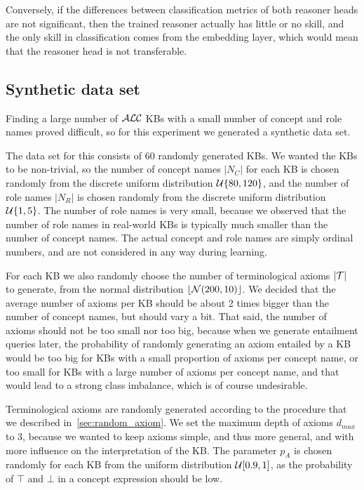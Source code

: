 Conversely, if the differences between classification metrics of both reasoner heads are not significant, then the trained reasoner actually has little or no skill, and the only skill in classification comes from the embedding layer, which would mean that the reasoner head is not transferable.

\subsection{Synthetic data set}

Finding a large number of $\mathcal{ALC}$ KBs with a small number of concept and role names proved difficult, so for this experiment we generated a synthetic data set.

The data set for this consists of 60 randomly generated KBs.
We wanted the KBs to be non-trivial, so the number of concept names $|N_C|$ for each KB is chosen randomly from the discrete uniform distribution $\mathcal{U} \{ 80, 120 \}$, and the number of role names $|N_R|$ is chosen randomly from the discrete uniform distribution $\mathcal{U} \{ 1, 5 \}$.
The number of role names is very small, because we observed that the number of role names in real-world KBs is typically much smaller than the number of concept names.
The actual concept and role names are simply ordinal numbers, and are not considered in any way during learning.

For each KB we also randomly choose the number of terminological axioms $|\mathcal{T}|$ to generate, from the normal distribution $\lfloor \mathcal{N}(200, 10) \rfloor$.
We decided that the average number of axioms per KB should be about 2 times bigger than the number of concept names, but should vary a bit.
That said, the number of axioms should not be too small nor too big, because when we generate entailment queries later, the probability of randomly generating an axiom entailed by a KB would be too big for KBs with a small proportion of axioms per concept name, or too small for KBs with a large number of axioms per concept name, and that would lead to a strong class imbalance, which is of course undesirable.

Terminological axioms are randomly generated according to the procedure that we described in~\autoref{sec:random_axiom}.
We set the maximum depth of axioms $d_{max}$ to 3, because we wanted to keep axioms simple, and thus more general, and with more influence on the interpretation of the KB.
The parameter $p_A$ is chosen randomly for each KB from the uniform distribution $\mathcal{U} [0.9, 1]$, as the probability of $\top$ and $\bot$ in a concept expression should be low.

